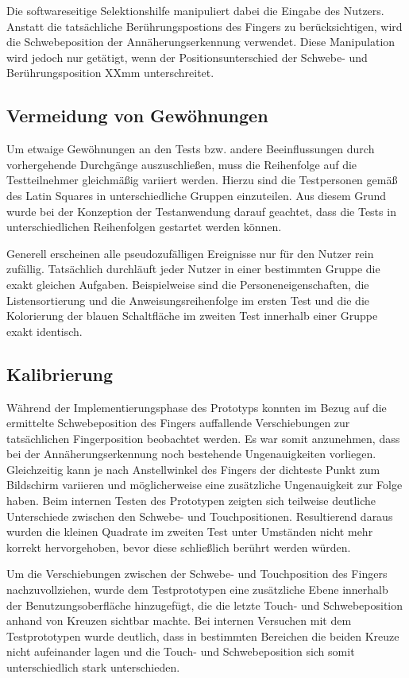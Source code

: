 \documentclass[a4paper,12pt,bibliography=totoc]{scrreprt}%
\begin{document}
Die softwareseitige Selektionshilfe manipuliert dabei die Eingabe des Nutzers. Anstatt die tatsächliche Berührungspostions des Fingers zu berücksichtigen, wird die Schwebeposition der Annäherungserkennung verwendet. Diese Manipulation wird jedoch nur getätigt, wenn der Positionsunterschied der Schwebe- und Berührungsposition XXmm unterschreitet.

\subsection{Vermeidung von Gewöhnungen}
Um etwaige Gewöhnungen an den Tests bzw. andere Beeinflussungen durch vorhergehende Durchgänge auszuschließen, muss die Reihenfolge auf die Testteilnehmer gleichmäßig variiert werden. Hierzu sind die Testpersonen gemäß des Latin Squares in unterschiedliche Gruppen einzuteilen. Aus diesem Grund wurde bei der Konzeption der Testanwendung darauf geachtet, dass die Tests in unterschiedlichen Reihenfolgen gestartet werden können.

Generell erscheinen alle pseudozufälligen Ereignisse nur für den Nutzer rein zufällig. Tatsächlich durchläuft jeder Nutzer in einer bestimmten Gruppe die exakt gleichen Aufgaben. Beispielweise sind die Personeneigenschaften, die Listensortierung und die Anweisungsreihenfolge im ersten Test und die die Kolorierung der blauen Schaltfläche im zweiten Test innerhalb einer Gruppe exakt identisch.

\subsection{Kalibrierung}
Während der Implementierungsphase des Prototyps konnten im Bezug auf die ermittelte Schwebeposition des Fingers auffallende  Verschiebungen zur tatsächlichen Fingerposition beobachtet werden. Es war somit anzunehmen, dass bei der Annäherungserkennung noch bestehende Ungenauigkeiten vorliegen. Gleichzeitig kann je nach Anstellwinkel des Fingers der dichteste Punkt zum Bildschirm variieren und möglicherweise eine zusätzliche Ungenauigkeit zur Folge haben. Beim internen Testen des Prototypen zeigten sich teilweise deutliche Unterschiede zwischen den Schwebe- und Touchpositionen. Resultierend daraus wurden die kleinen Quadrate im zweiten Test unter Umständen nicht mehr korrekt hervorgehoben, bevor diese schließlich berührt werden würden.

Um die Verschiebungen zwischen der Schwebe- und Touchposition des Fingers nachzuvollziehen, wurde dem Testprototypen eine zusätzliche Ebene innerhalb der Benutzungsoberfläche hinzugefügt, die die letzte Touch- und Schwebeposition anhand von Kreuzen sichtbar machte. Bei internen Versuchen mit dem Testprototypen wurde deutlich, dass in bestimmten Bereichen die beiden Kreuze nicht aufeinander lagen und die Touch- und Schwebeposition sich somit unterschiedlich stark unterschieden.
\end{document}
